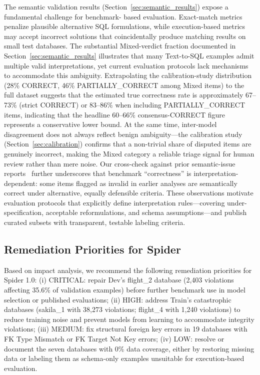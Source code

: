 \documentclass[print]{einformatica}
\begin{document}
The semantic validation results (Section~\ref{sec:semantic_results}) expose a fundamental challenge for benchmark- based evaluation. Exact-match metrics penalize plausible alternative SQL formulations, while execution-based metrics may accept incorrect solutions that coincidentally produce matching results on small test databases. The substantial Mixed-verdict fraction documented in Section~\ref{sec:semantic_results} illustrates that many Text-to-SQL examples admit multiple valid interpretations, yet current evaluation protocols lack mechanisms to accommodate this ambiguity. Extrapolating the calibration-study distribution (28\% CORRECT, 46\% PARTIALLY\_CORRECT among Mixed items) to the full dataset suggests that the estimated true correctness rate is approximately 67--73\% (strict CORRECT) or 83--86\% when including PARTIALLY\_CORRECT items, indicating that the headline 60--66\% consensus-CORRECT figure represents a conservative lower bound. At the same time, inter-model disagreement does not always reflect benign ambiguity---the calibration study (Section~\ref{sec:calibration}) confirms that a non-trivial share of disputed items are genuinely incorrect, making the Mixed category a reliable triage signal for human review rather than mere noise. Our cross-check against prior semantic-issue reports~\cite{liu2025nl2sqlbugs} further underscores that benchmark ``correctness'' is interpretation-dependent: some items flagged as invalid in earlier analyses are semantically correct under alternative, equally defensible criteria. These observations motivate evaluation protocols that explicitly define interpretation rules---covering under-specification, acceptable reformulations, and schema assumptions---and publish curated subsets with transparent, testable labeling criteria.

\subsection{Remediation Priorities for Spider}

Based on impact analysis, we recommend the following remediation priorities for Spider 1.0: (i) CRITICAL: repair Dev's flight\_2 database (2,403 violations affecting 35.6\% of validation examples) before further benchmark use in model selection or published evaluations; (ii) HIGH: address Train's catastrophic databases (sakila\_1 with 38,273 violations; flight\_4 with 1,240 violations) to reduce training noise and prevent models from learning to accommodate integrity violations; (iii) MEDIUM: fix structural foreign key errors in 19 databases with FK Type Mismatch or FK Target Not Key errors; (iv) LOW: resolve or document the seven databases with 0\% data coverage, either by restoring missing data or labeling them as schema-only examples unsuitable for execution-based evaluation.
\end{document}
